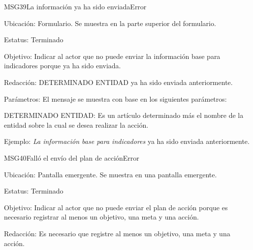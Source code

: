 \begin{mensaje}{MSG39}{La información ya ha sido enviada}{Error}
\item[Ubicación:] Formulario. Se muestra en la parte superior del formulario.
\item[Estatus:] Terminado
\item[Objetivo:] Indicar al actor que no puede enviar la información base para indicadores porque ya ha sido enviada.
\item[Redacción:] DETERMINADO ENTIDAD ya ha sido enviada anteriormente.
\item[Parámetros:] El mensaje se muestra con base en los siguientes parámetros:
\begin{Citemize}
	\item DETERMINADO ENTIDAD: Es un artículo determinado más el nombre de la entidad sobre la cual se desea realizar la acción.
\end{Citemize}
\item[Ejemplo:] {\em La información base para indicadores} ya ha sido enviada anteriormente.
\end{mensaje}
\begin{mensaje}{MSG40}{Falló el envío del plan de acción}{Error}
\item[Ubicación:] Pantalla emergente. Se muestra en una pantalla emergente.
\item[Estatus:] Terminado
\item[Objetivo:] Indicar al actor que no puede enviar el plan de acción porque es necesario registrar al menos un objetivo, una meta y una acción.
\item[Redacción:] Es necesario que registre al menos un objetivo, una meta y una acción.
\end{mensaje}
